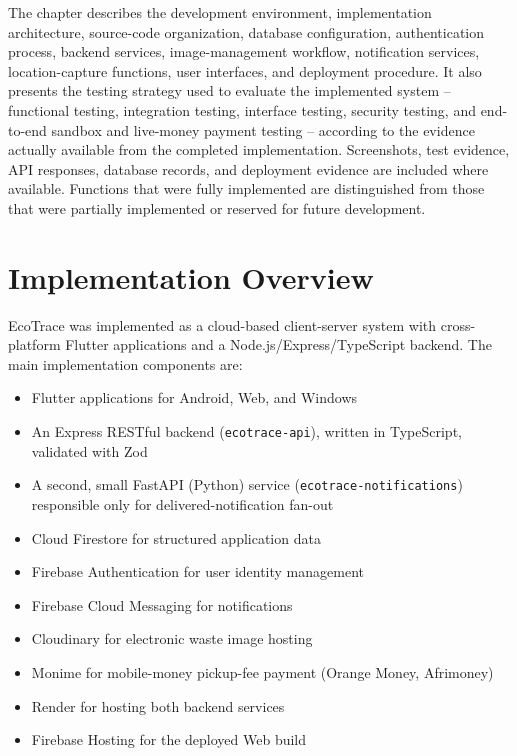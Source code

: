 The chapter describes the development environment, implementation
architecture, source-code organization, database configuration, authentication
process, backend services, image-management workflow, notification
services, location-capture functions, user interfaces, and deployment
procedure. It also presents the testing strategy used to evaluate the
implemented system -- functional testing, integration testing, interface
testing, security testing, and end-to-end sandbox and live-money payment
testing -- according to the evidence actually available from the completed
implementation. Screenshots, test evidence, API responses, database records,
and deployment evidence are included where available. Functions that were
fully implemented are distinguished from those that were partially
implemented or reserved for future development.

\section{Implementation Overview}

EcoTrace was implemented as a cloud-based client-server system with
cross-platform Flutter applications and a Node.js/Express/TypeScript
backend. The main implementation components are:

\begin{itemize}
  \item Flutter applications for Android, Web, and Windows
  \item An Express RESTful backend (\texttt{ecotrace-api}), written in
    TypeScript, validated with Zod
  \item A second, small FastAPI (Python) service (\texttt{ecotrace-notifications})
    responsible only for delivered-notification fan-out
  \item Cloud Firestore for structured application data
  \item Firebase Authentication for user identity management
  \item Firebase Cloud Messaging for notifications
  \item Cloudinary for electronic waste image hosting
  \item Monime for mobile-money pickup-fee payment (Orange Money, Afrimoney)
  \item Render for hosting both backend services
  \item Firebase Hosting for the deployed Web build
\end{itemize}

